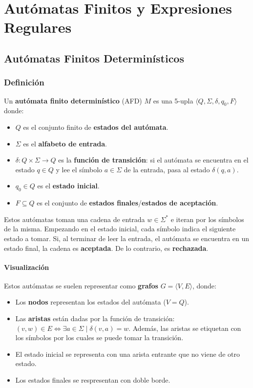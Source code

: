 \chapter{Autómatas Finitos y Expresiones Regulares}

\section{Autómatas Finitos Determinísticos}

\label{subsec-definicion-afds}
\subsection{Definición}

Un \textbf{autómata finito determinístico} (AFD) $M$ es una 5-upla $\langle Q, \Sigma, \delta, q_0, F \rangle$ donde:
\begin{itemize}
    \item $Q$ es el conjunto finito de \textbf{estados del autómata}.
    \item $\Sigma$ es el \textbf{alfabeto de entrada}.
    \item $\delta: Q \times \Sigma \to Q$ es la \textbf{función de transición}: si el autómata se encuentra en el estado $q \in Q$ y lee el símbolo $a \in \Sigma$ de la entrada, pasa al estado $\delta(q, a)$.
    \item $q_0 \in Q$ es el \textbf{estado inicial}.
    \item $F \subseteq Q$ es el conjunto de \textbf{estados finales}/\textbf{estados de aceptación}.
\end{itemize}


Estos autómatas toman una cadena de entrada $w \in \Sigma^*$ e iteran por los símbolos de la misma. Empezando en el estado inicial, cada símbolo indica el siguiente estado a tomar. Si, al terminar de leer la entrada, el autómata se encuentra en un estado final, la cadena es \textbf{aceptada}. De lo contrario, es \textbf{rechazada}.

\subsubsection{Visualización}

Estos autómatas se suelen representar como \textbf{grafos} $G = \langle V, E \rangle$, donde:
\begin{itemize}
    \item Los \textbf{nodos} representan los estados del autómata ($V = Q$).
    \item Las \textbf{aristas} están dadas por la función de transición: $(v, w) \in E \iff \exists a \in \Sigma \mid \delta(v, a) = w$. Además, las aristas se etiquetan con los símbolos por los cuales se puede tomar la transición.
    \item El estado inicial se representa con una arista entrante que no viene de otro estado.
    \item Los estados finales se respresentan con doble borde.
\end{itemize}

